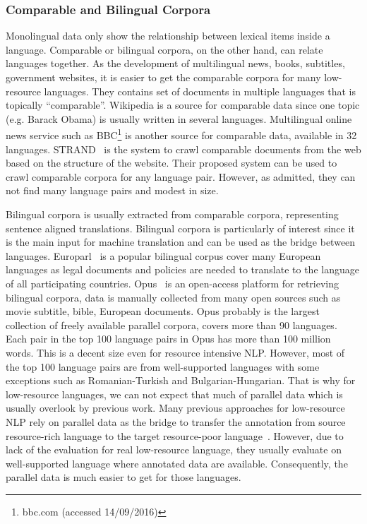 \documentclass[12pt,twoside,final,hidelinks]{ltthesis}
\theoremstyle{definition}
\begin{document}
\subsubsection{Comparable and Bilingual Corpora}
Monolingual data only show the relationship between lexical items inside a language. Comparable or bilingual corpora, on the other hand, can relate languages together. 
As the development of multilingual news, books, subtitles, government websites, it is easier to get the comparable corpora for many low-resource languages. They contains set of documents in multiple languages that is topically ``comparable''. Wikipedia is a source for comparable data since one topic (e.g. Barack Obama) is usually written in several languages. Multilingual online news service such as BBC\footnote{bbc.com (accessed 14/09/2016)} is another source for comparable data, available in 32 languages. STRAND~\cite{Resnik:2003:WPC:964751.964753} is the system to crawl comparable documents from the web based on the structure of the website. Their proposed system can be used to crawl comparable corpora for any language pair. However, as admitted, they can not find many language pairs and modest in size. 

Bilingual corpora is usually extracted from comparable corpora, representing sentence 
aligned translations. Bilingual corpora is particularly of interest since it is the 
main input for machine translation and can be used as the bridge between languages. 
Europarl~\cite{europarl} is a popular bilingual corpus cover many European languages 
as legal documents and policies are needed to translate to the language of all 
participating countries. Opus~\cite{TIEDEMANN12.463.L12-1246} is an open-access platform 
for retrieving bilingual corpora, data is manually collected from many open
 sources such as movie subtitle, bible, European documents. Opus probably is the
 largest collection of freely available parallel corpora, covers more than 90 
 languages. Each pair in the top 100 language pairs in Opus has more than 100 million 
 words. This is a decent size even for resource intensive NLP. However, most of the 
 top 100 language pairs are from well-supported languages with some 
 exceptions such as Romanian-Turkish and Bulgarian-Hungarian. That is why for low-resource languages, we can not expect that much of parallel data which is usually overlook by previous work. 
Many previous approaches for low-resource NLP rely on parallel data as the bridge to 
transfer the annotation from source resource-rich language to the target resource-poor 
language~\cite{Das:2011,Duongacl13}. However, due to lack of the 
evaluation for real low-resource language, they usually evaluate on well-supported 
language where annotated data are available. Consequently, the parallel data is much easier to get for those languages. 
\end{document}
